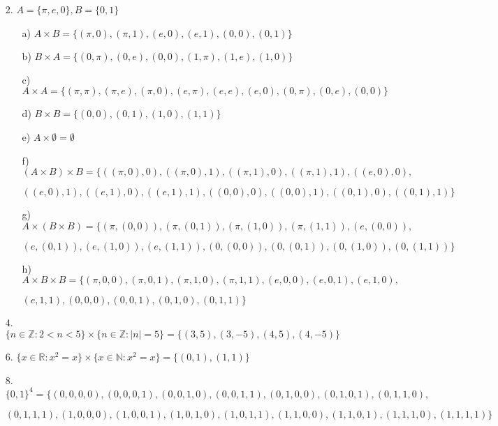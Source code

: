\documentclass{article}
\begin{document}
\begin{enumerate}
    \item [2.] $A=\{\pi, e, 0\}, B=\{0,1\}$
    \begin{enumerate}
        \item[a)] $ A \times B = \{(\pi, 0),(\pi, 1),(e, 0),(e, 1),(0, 0),(0, 1)\}$
        \item[b)] $ B \times A = \{(0, \pi),(0, e),(0, 0),(1, \pi),(1, e),(1, 0)\}$
        \item[c)] $ A \times A = \{(\pi, \pi),(\pi, e),(\pi, 0),(e, \pi),(e, e),(e, 0),(0, \pi),(0, e),(0, 0)\}$
        \item[d)] $ B \times B = \{(0, 0),(0, 1),(1, 0),(1, 1)\}$
        \item[e)] $ A \times \emptyset = \emptyset$
        \item[f)] $ (A \times B) \times B = \{((\pi, 0), 0),((\pi, 0), 1),((\pi, 1), 0),((\pi, 1), 1),((e, 0), 0),$
        \item[] $ ((e, 0), 1),((e, 1), 0),((e, 1), 1),((0, 0), 0),((0, 0), 1),((0, 1), 0),((0, 1), 1)\} $
        \item[g)] $ A \times (B \times B) = \{(\pi, (0, 0)),(\pi, (0, 1)),(\pi, (1, 0)),(\pi, (1, 1)),(e, (0, 0)),$
        \item[] $ (e, (0, 1)),(e, (1, 0)),(e, (1, 1)),(0, (0, 0)),(0, (0, 1)),(0, (1, 0)),(0, (1, 1))\}$
        \item[h)] $ A \times B \times B = \{(\pi, 0, 0),(\pi, 0, 1),(\pi, 1, 0),(\pi, 1, 1),(e, 0, 0),(e, 0, 1),(e, 1, 0),$
        \item[] $ (e, 1, 1),(0, 0, 0),(0, 0, 1),(0, 1, 0),(0, 1, 1)\}$
    \end{enumerate}
    \item [4.] $\{n \in \mathbb{Z}: 2<n<5\} \times \{n \in \mathbb{Z}:|n|=5\}=\{(3, 5),(3, -5),(4, 5),(4, -5)\}$
    \item [6.] $\{x \in \mathbb{R}: x^2=x\} \times \{x \in \mathbb{N}:x^2=x\}=\{(0, 1),(1, 1)\}$
    \item [8.] $\{0,1\}^4=\{(0, 0, 0, 0),(0, 0, 0, 1),(0, 0, 1, 0),(0, 0, 1, 1),(0, 1, 0, 0),(0, 1, 0, 1),(0, 1, 1, 0),$
    \item [] $ (0, 1, 1, 1),(1, 0, 0, 0),(1, 0, 0, 1),(1, 0, 1, 0),(1, 0, 1, 1),(1, 1, 0, 0),(1, 1, 0, 1),(1, 1, 1, 0),(1, 1, 1, 1)\}$
\end{enumerate}
\clearpage
\end{document}
